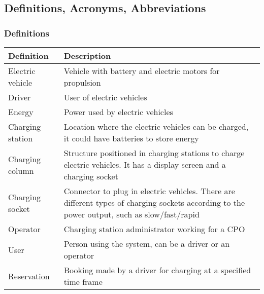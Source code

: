 \documentclass[../main.tex]{subfiles}
\begin{document}
\subsection{Definitions, Acronyms, Abbreviations}
\subsubsection{Definitions}
\vspace{-1em}
\begin{center}
\begin{longtable}{| l | p{10cm} | } 
\hline
\textbf{Definition} & \textbf{Description} \\
\hline
Electric vehicle & Vehicle with battery and electric motors for propulsion \\ 
\hline
Driver & User of electric vehicles \\ 
\hline
Energy & Power used by electric vehicles \\
\hline
Charging station & Location where the electric vehicles can be charged, it could have batteries to store energy \\
\hline
Charging column & Structure positioned in charging stations to charge electric vehicles. It has a display screen and a charging socket \\
\hline
Charging socket & Connector to plug in electric vehicles. There are different types of charging sockets according to the power output, such as slow/fast/rapid \\
\hline
Operator & Charging station administrator working for a CPO \\
\hline
User & Person using the system, can be a driver or an operator \\
\hline
Reservation & Booking made by a driver for charging at a specified time frame \\
\hline
\end{longtable}
\end{center}

\vspace{-3em}
\end{document}
